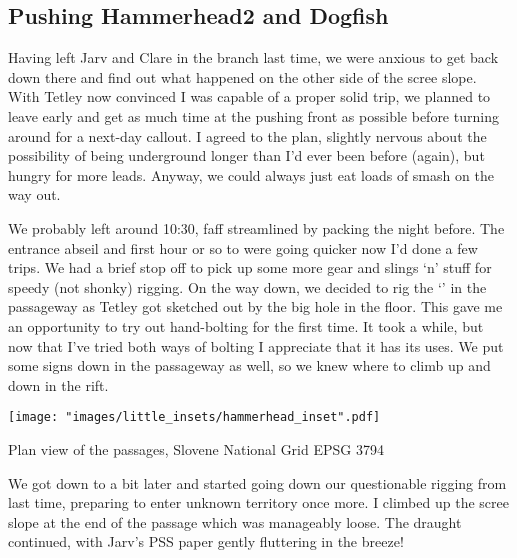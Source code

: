 
\subsection{Pushing Hammerhead2 and Dogfish}


Having left Jarv and Clare in the  branch last time, we were anxious to get back down there and find out what happened on the other side of the scree slope. With Tetley now convinced I was capable of a proper solid trip, we planned to leave early and get as much time at the pushing front as possible before turning around for a next-day callout. I agreed to the plan, slightly nervous about the possibility of being underground longer than I'd ever been before (again), but hungry for more leads. Anyway, we could always just eat loads of smash on the way out.
				 
We probably left around 10:30, faff streamlined by packing the night before. The entrance abseil and first hour or so to  were going quicker now I'd done a few trips. We had a brief stop off to pick up some more gear and slings `n' stuff for speedy (not shonky) rigging. On the way down, we decided to rig the `' in the  passageway as Tetley got sketched out by the big hole in the floor. This gave me an opportunity to try out hand-bolting for the first time. It took a while, but now that I've tried both ways of bolting I appreciate that it has its uses. We put some signs down in the  passageway as well, so we knew where to climb up and down in the rift.

\begin{marginsurvey}
	\texttt{[image: "images/little\_insets/hammerhead\_inset".pdf]}
	\caption[Manđare junction]{Plan view of the \protect{} passages, Slovene National Grid EPSG 3794}
\end{marginsurvey}

We got down to  a bit later and started going down our questionable rigging from last time, preparing to enter unknown territory once more. I climbed up the scree slope at the end of the passage which was manageably loose. The draught continued, with Jarv's PSS paper gently fluttering in the breeze! 

